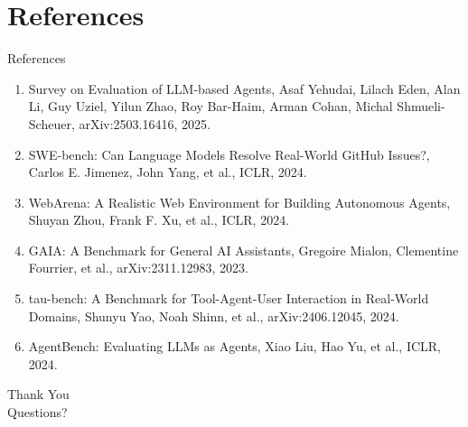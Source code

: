 \documentclass[10pt]{beamer}
\begin{document}
\section{References}
\begin{frame}[allowframebreaks]{References}
  \footnotesize
  \begin{enumerate}
    \item Survey on Evaluation of LLM-based Agents, Asaf Yehudai, Lilach Eden, Alan Li, Guy Uziel, Yilun Zhao, Roy Bar-Haim, Arman Cohan, Michal Shmueli-Scheuer, arXiv:2503.16416, 2025.
    \item SWE-bench: Can Language Models Resolve Real-World GitHub Issues?, Carlos E. Jimenez, John Yang, et al., ICLR, 2024.
    \item WebArena: A Realistic Web Environment for Building Autonomous Agents, Shuyan Zhou, Frank F. Xu, et al., ICLR, 2024.
    \item GAIA: A Benchmark for General AI Assistants, Gregoire Mialon, Clementine Fourrier, et al., arXiv:2311.12983, 2023.
    \item tau-bench: A Benchmark for Tool-Agent-User Interaction in Real-World Domains, Shunyu Yao, Noah Shinn, et al., arXiv:2406.12045, 2024.
    \item AgentBench: Evaluating LLMs as Agents, Xiao Liu, Hao Yu, et al., ICLR, 2024.
  \end{enumerate}
\end{frame}

\begin{frame}[plain]
  \begin{center}
    {\Huge Thank You}\\[1em]
    {\large Questions?}
  \end{center}
\end{frame}
\end{document}
